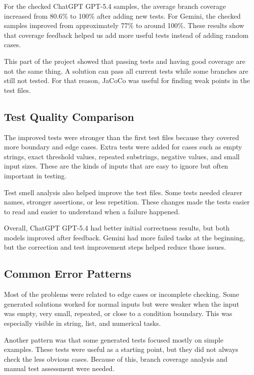 \documentclass[journal]{IEEEtran}
\begin{document}
For the checked ChatGPT GPT-5.4 samples, the average branch coverage increased from 80.6\% to 100\% after adding new tests. For Gemini, the checked samples improved from approximately 77\% to around 100\%. These results show that coverage feedback helped us add more useful tests instead of adding random cases.

This part of the project showed that passing tests and having good coverage are not the same thing. A solution can pass all current tests while some branches are still not tested. For that reason, JaCoCo was useful for finding weak points in the test files.

\subsection{Test Quality Comparison}

The improved tests were stronger than the first test files because they covered more boundary and edge cases. Extra tests were added for cases such as empty strings, exact threshold values, repeated substrings, negative values, and small input sizes. These are the kinds of inputs that are easy to ignore but often important in testing.

Test smell analysis also helped improve the test files. Some tests needed clearer names, stronger assertions, or less repetition. These changes made the tests easier to read and easier to understand when a failure happened.

Overall, ChatGPT GPT-5.4 had better initial correctness results, but both models improved after feedback. Gemini had more failed tasks at the beginning, but the correction and test improvement steps helped reduce those issues.

\subsection{Common Error Patterns}

Most of the problems were related to edge cases or incomplete checking. Some generated solutions worked for normal inputs but were weaker when the input was empty, very small, repeated, or close to a condition boundary. This was especially visible in string, list, and numerical tasks.

Another pattern was that some generated tests focused mostly on simple examples. These tests were useful as a starting point, but they did not always check the less obvious cases. Because of this, branch coverage analysis and manual test assessment were needed.
\end{document}
